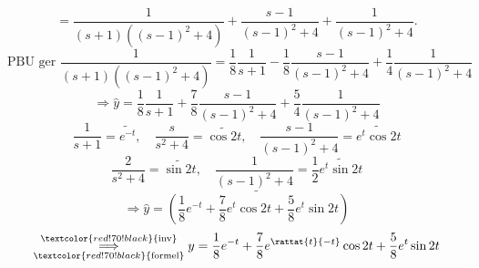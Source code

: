 \[ = \frac{1}{(s + 1)((s - 1)^2 + 4)} + \frac{s - 1}{(s - 1)^2 + 4} + \frac{1}{(s - 1)^2 + 4}. \]
\[ \text{PBU ger } \frac{1}{(s + 1)((s - 1)^2 + 4)} = \frac{1}{8} \frac{1}{s + 1} - \frac{1}{8} \frac{s - 1}{(s - 1)^2 + 4} + \frac{1}{4} \frac{1}{(s - 1)^2 + 4} \]
\[ \Longrightarrow \hat{y} = \frac{1}{8} \frac{1}{s + 1} + \frac{7}{8} \frac{s - 1}{(s - 1)^2 + 4} + \frac{5}{4} \frac{1}{(s - 1)^2 + 4} \]
\[ \frac{1}{s + 1} = \widetilde{e^{-t}}, \quad \frac{s}{s^2 + 4} = \widetilde{\cos 2t}, \quad \frac{s - 1}{(s - 1)^2 + 4} = \widetilde{e^t \cos 2t} \]
\[ \frac{2}{s^2 + 4} = \widetilde{\sin 2t}, \quad \frac{1}{(s - 1)^2 + 4} = \frac{1}{2}\widetilde{e^t \sin 2t} \]
\[ \Longrightarrow \hat{y} = \widetilde{\left( \frac{1}{8}e^{-t} + \frac{7}{8}e^t \cos 2t + \frac{5}{8}e^t \sin 2t \right)} \]
\[ \underset{\textcolor{red!70!black}{\text{formel}}}{\overset{\textcolor{red!70!black}{\text{inv}}}{\Longrightarrow}} y = \frac{1}{8}e^{-t} + \frac{7}{8}e^{\rattat{t}{-t}} \cos 2t + \frac{5}{8}e^t \sin 2t \]
